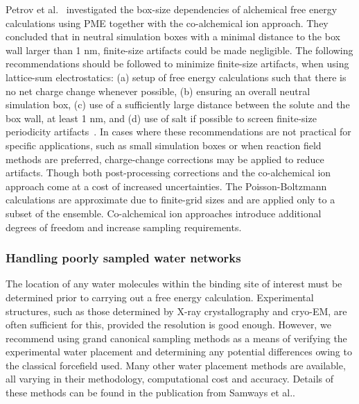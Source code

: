 \documentclass[9pt,bestpractices]{livecoms}
\begin{document}
Petrov et al.~\cite{Petrov2024guidelines} investigated the box-size dependencies of alchemical free energy calculations using PME together with the co-alchemical ion approach. They concluded that in neutral simulation boxes with a minimal distance to the box wall larger than 1 nm, finite-size artifacts could be made negligible. The following recommendations should be followed to minimize finite-size artifacts, when using lattice-sum electrostatics: (a) setup of free energy calculations such that there is no net charge change whenever possible, (b) ensuring an overall neutral simulation box, (c) use of a sufficiently large distance between the solute and the box wall, at least 1 nm, and (d) use of salt if possible to screen finite-size periodicity artifacts~\cite{chen2018accurate}. In cases where these recommendations are not practical for specific applications, such as small simulation boxes or when reaction field methods are preferred, charge-change corrections may be applied to reduce artifacts. Though both post-processing corrections and the co-alchemical ion approach come at a cost of increased uncertainties. The Poisson-Boltzmann calculations are approximate due to finite-grid sizes and are applied only to a subset of the ensemble. Co-alchemical ion approaches introduce additional degrees of freedom and increase sampling requirements.

\subsubsection{Handling poorly sampled water networks}
The location of any water molecules within the binding site of interest must be determined prior to carrying out a free energy calculation. Experimental structures, such as those determined by X-ray crystallography and cryo-EM, are often sufficient for this, provided the resolution is good enough. However, we recommend using grand canonical sampling methods\cite{melling2023enhanced, samways2020grand} as a means of verifying the experimental water placement and determining any potential differences owing to the classical forcefield used. Many other water placement methods are available, all varying in their methodology, computational cost and accuracy. Details of these methods can be found in the publication from Samways et al.\cite{samways2021water}.
\end{document}
